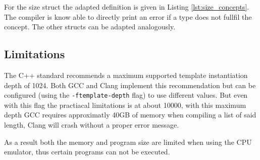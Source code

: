 For the size struct the adapted definition is given in Listing \ref{lst:size_concepts}. The compiler is know able to directly print an error if a type does not fullfil the concept.
The other structs can be adapted analogously.


\subsection{Limitations}
The C++ standard recommends a maximum supported template instantiation depth of 1024.
Both GCC and Clang implement this recommendation but can be configured 
(using the \texttt{-ftemplate-depth} flag) to use different values. But even with
this flag the practiacal limitations is at about 10000, with this maximum depth
GCC requires approximatly 40GB of memory when compiling a list of said length, Clang will
crash without a proper error message.

As a result both the memory and program size are limited when using the CPU emulator,
thus certain programs can not be executed.
